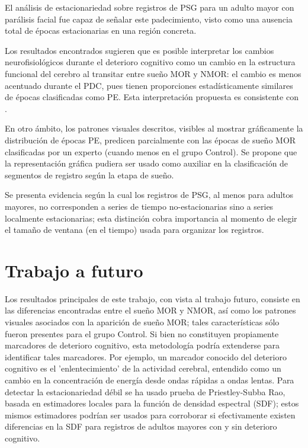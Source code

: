 \documentclass[12pt,a4paper]{mitthesis}
\begin{document}
El an\'alisis de estacionariedad sobre registros de PSG para un adulto mayor con par\'alisis facial 
fue capaz de se\~nalar este padecimiento, visto como una ausencia total de \'epocas estacionarias
en una regi\'on concreta.

Los resultados encontrados sugieren que es posible interpretar los cambios neurofisiol\'ogicos 
durante el deterioro cognitivo como un cambio en la estructura funcional del cerebro al transitar 
entre sue\~no MOR y NMOR: el cambio es menos acentuado durante el PDC, pues tienen proporciones 
estad\'isticamente similares de \'epocas clasificadas como PE.
Esta interpretaci\'on propuesta es consistente con \cite{Valeria}.

En otro \'ambito, los patrones visuales descritos, visibles al mostrar gr\'aficamente la 
distribuci\'on de \'epocas PE, predicen parcialmente con las \'epocas de sue\~no MOR clasificadas 
por un experto (cuando menos en el grupo Control).
Se propone que la representaci\'on gr\'afica pudiera ser usado como auxiliar en la clasificaci\'on 
de segmentos de registro seg\'un la etapa de sue\~no.

Se presenta evidencia seg\'un la cual los registros de PSG, al menos para adultos mayores, no 
corresponden a series de tiempo no-estacionarias sino a series localmente estacionarias; esta 
distinci\'on cobra importancia al momento de elegir el tama\~no de ventana (en el tiempo) usada 
para organizar los registros.



\section{Trabajo a futuro}

Los resultados principales de este trabajo, con vista al trabajo futuro, consiste en las 
diferencias encontradas entre el sue\~no MOR y NMOR, as\'i como los patrones visuales asociados con 
la aparici\'on de sue\~no MOR; tales caracter\'isticas s\'olo fueron presentes para el grupo 
Control. Si bien no constituyen propiamente marcadores de deterioro cognitivo, esta metodolog\'ia
podr\'ia extenderse para identificar tales marcadores.
Por ejemplo, un marcador conocido \cite{Becerra12} del deterioro cognitivo es el 'enlentecimiento' 
de la actividad cerebral, entendido como un cambio en la concentraci\'on de energ\'ia desde ondas 
r\'apidas a ondas lentas.
Para detectar la estacionariedad d\'ebil se ha usado prueba de Priestley-Subba Rao, basada en 
estimadores locales para la funci\'on de densidad espectral (SDF); estos mismos estimadores 
podr\'ian ser usados para corroborar si efectivamente existen diferencias en la SDF para registros 
de adultos mayores con y sin deterioro cognitivo. 
\end{document}
